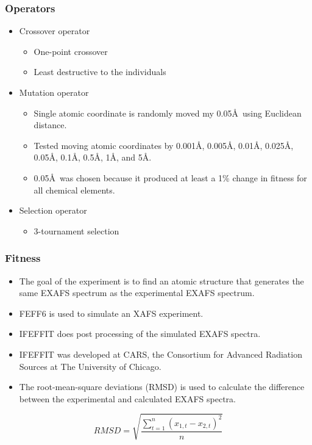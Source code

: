 \documentclass[10pt]{beamer}
\begin{document}
\begin{frame}
	\frametitle{Operators}

	\begin{itemize}
		\item Crossover operator
			\begin{itemize}
				\item One-point crossover
				\item Least destructive to the individuals
			\end{itemize}
		\item Mutation operator
			\begin{itemize}
				\item Single atomic coordinate is randomly moved my 0.05\AA\ using Euclidean distance.
				\item Tested moving atomic coordinates by 0.001\AA, 0.005\AA, 0.01\AA, 0.025\AA, 0.05\AA, 0.1\AA, 0.5\AA, 1\AA, and 5\AA.
				\item 0.05\AA\ was chosen because it produced at least a 1\% change in fitness for all chemical elements.
			\end{itemize}
		\item Selection operator
			\begin{itemize}
				\item 3-tournament selection
			\end{itemize}
	\end{itemize}

\end{frame}

\begin{frame}
	\frametitle{Fitness}

	\begin{itemize}
		\item The goal of the experiment is to find an atomic structure that generates the same EXAFS spectrum as the experimental EXAFS spectrum.
		\item FEFF6 is used to simulate an XAFS experiment.
		\item IFEFFIT does post processing of the simulated EXAFS spectra.
		\item IFEFFIT was developed at CARS, the Consortium for Advanced Radiation Sources at The University of Chicago.
		\item The root-mean-square deviations (RMSD) is used to calculate the difference between the experimental and calculated EXAFS spectra.
	\end{itemize}

	\begin{equation}
		RMSD = \sqrt{\frac{\sum_{t=1}^{n} \left ( x_{1,t}-x_{2,t} \right )^{2}}{n}}
	\end{equation}

\end{frame}
\end{document}
